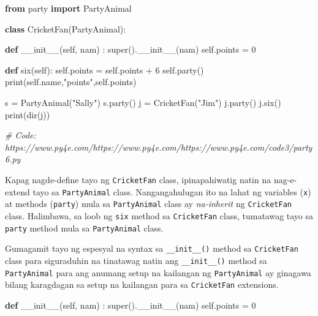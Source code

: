 \documentclass[10pt,]{book}
\newenvironment{Shaded}{}{}
\newcommand{\BuiltInTok}[1]{\textcolor[rgb]{0.00,0.50,0.00}{#1}}
\newcommand{\CommentTok}[1]{\textcolor[rgb]{0.38,0.63,0.69}{\textit{#1}}}
\newcommand{\DecValTok}[1]{\textcolor[rgb]{0.25,0.63,0.44}{#1}}
\newcommand{\FunctionTok}[1]{\textcolor[rgb]{0.02,0.16,0.49}{#1}}
\newcommand{\ImportTok}[1]{\textcolor[rgb]{0.00,0.50,0.00}{\textbf{#1}}}
\newcommand{\KeywordTok}[1]{\textcolor[rgb]{0.00,0.44,0.13}{\textbf{#1}}}
\newcommand{\NormalTok}[1]{#1}
\newcommand{\OperatorTok}[1]{\textcolor[rgb]{0.40,0.40,0.40}{#1}}
\newcommand{\StringTok}[1]{\textcolor[rgb]{0.25,0.44,0.63}{#1}}
\newcommand{\VariableTok}[1]{\textcolor[rgb]{0.10,0.09,0.49}{#1}}
\begin{document}
\begin{Shaded}
\begin{Highlighting}[]
\ImportTok{from}\NormalTok{ party }\ImportTok{import}\NormalTok{ PartyAnimal}

\KeywordTok{class}\NormalTok{ CricketFan(PartyAnimal):}

   \KeywordTok{def} \FunctionTok{\_\_init\_\_}\NormalTok{(}\VariableTok{self}\NormalTok{, nam) :}
       \BuiltInTok{super}\NormalTok{().}\FunctionTok{\_\_init\_\_}\NormalTok{(nam)}
       \VariableTok{self}\NormalTok{.points }\OperatorTok{=} \DecValTok{0}

   \KeywordTok{def}\NormalTok{ six(}\VariableTok{self}\NormalTok{):}
      \VariableTok{self}\NormalTok{.points }\OperatorTok{=} \VariableTok{self}\NormalTok{.points }\OperatorTok{+} \DecValTok{6}
      \VariableTok{self}\NormalTok{.party()}
      \BuiltInTok{print}\NormalTok{(}\VariableTok{self}\NormalTok{.name,}\StringTok{"points"}\NormalTok{,}\VariableTok{self}\NormalTok{.points)}

\NormalTok{s }\OperatorTok{=}\NormalTok{ PartyAnimal(}\StringTok{"Sally"}\NormalTok{)}
\NormalTok{s.party()}
\NormalTok{j }\OperatorTok{=}\NormalTok{ CricketFan(}\StringTok{"Jim"}\NormalTok{)}
\NormalTok{j.party()}
\NormalTok{j.six()}
\BuiltInTok{print}\NormalTok{(}\BuiltInTok{dir}\NormalTok{(j))}

\CommentTok{\# Code: https://www.py4e.com/https://www.py4e.com/https://www.py4e.com/code3/party6.py}
\end{Highlighting}
\end{Shaded}

Kapag nagde-define tayo ng \texttt{CricketFan} class, ipinapahiwatig
natin na nag-e-extend tayo sa \texttt{PartyAnimal} class.
Nangangahulugan ito na lahat ng variables (\texttt{x}) at methods
(\texttt{party}) mula sa \texttt{PartyAnimal} class ay \emph{na-inherit}
ng \texttt{CricketFan} class. Halimbawa, sa loob ng \texttt{six} method
sa \texttt{CricketFan} class, tumatawag tayo sa \texttt{party} method
mula sa \texttt{PartyAnimal} class.

Gumagamit tayo ng espesyal na syntax sa \texttt{\_\_init\_\_()} method
sa \texttt{CricketFan} class para siguraduhin na tinatawag natin ang
\texttt{\_\_init\_\_()} method sa \texttt{PartyAnimal} para ang anumang
setup na kailangan ng \texttt{PartyAnimal} ay ginagawa bilang karagdagan
sa setup na kailangan para sa \texttt{CricketFan} extensions.

\begin{Shaded}
\begin{Highlighting}[]
   \KeywordTok{def} \FunctionTok{\_\_init\_\_}\NormalTok{(}\VariableTok{self}\NormalTok{, nam) :}
       \BuiltInTok{super}\NormalTok{().}\FunctionTok{\_\_init\_\_}\NormalTok{(nam)}
       \VariableTok{self}\NormalTok{.points }\OperatorTok{=} \DecValTok{0}
\end{Highlighting}
\end{Shaded}
\end{document}
